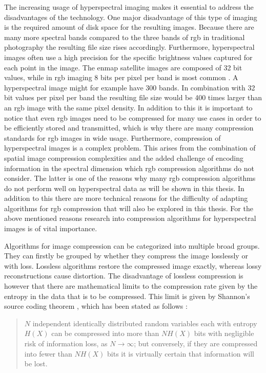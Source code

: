 The increasing usage of hyperspectral imaging makes it essential to address the disadvantages of the technology. One major disadvantage of this type of imaging is the required amount of disk space for the resulting images. Because there are many more spectral bands compared to the three bands of \ac{rgb} in traditional photography the resulting file size rises accordingly. Furthermore, hyperspectral images often use a high precision for the specific brightness values captured for each point in the image. The \ac{enmap} satellite images are composed of 32 bit values, while in \ac{rgb} imaging 8 bits per pixel per band is most common \citep{guanter_enmap_2015}. A hyperspectral image might for example have 300 bands. In combination with 32 bit values per pixel per band the resulting file size would be 400 times larger than an \ac{rgb} image with the same pixel density. In addition to this it is important to notice that even \ac{rgb} images need to be compressed for many use cases in order to be efficiently stored and transmitted, which is why there are many compression standards for \ac{rgb} images in wide usage.
Furthermore, compression of hyperspectral images is a complex problem. This arises from the combination of spatial image compression complexities and the added challenge of encoding information in the spectral dimension which \ac{rgb} compression algorithms do not consider. The latter is one of the reasons why many \ac{rgb} compression algorithms do not perform well on hyperspectral data as will be shown in this thesis. In addition to this there are more technical reasons for the difficulty of adapting algorithms for \ac{rgb} compression that will also be explored in this thesis. For the above mentioned reasons research into compression algorithms for hyperspectral images is of vital importance.

Algorithms for image compression can be categorized into multiple broad groups. They can firstly be grouped by whether they compress the image losslessly or with loss. Lossless algorithms restore the compressed image exactly, whereas lossy reconstructions cause distortion. The disadvantage of lossless compression is however that there are mathematical limits to the compression rate given by the entropy in the data that is to be compressed. This limit is given by Shannon's source coding theorem \citep{shannon_mathematical_1948}, which has been stated as follows \citep{mackay_information_2003}:

\begin{quotation}
$N$ independent identically distributed random variables each with entropy $H(X)$ can be compressed into more than $NH(X)$ bits with negligible risk of information loss, as $N \rightarrow \infty$; but conversely, if they are compressed into fewer than $NH(X)$ bits it is virtually certain that information will be lost.
\end{quotation}

